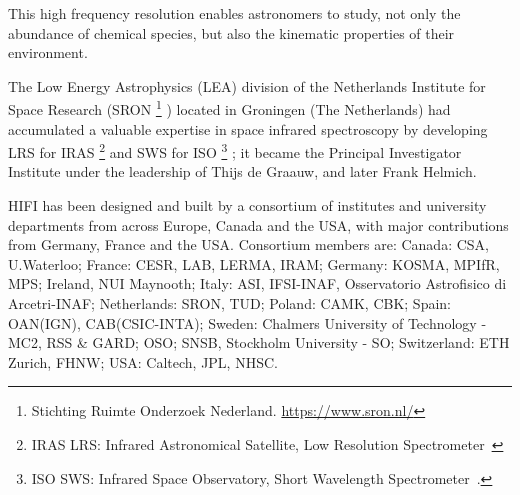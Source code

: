 This high frequency resolution enables astronomers to study, not only the abundance of chemical species, but also the kinematic properties of their environment.

The Low Energy Astrophysics (LEA) division of the Netherlands Institute for Space Research (SRON%
\footnote{
    Stichting Ruimte Onderzoek Nederland.
    \url{https://www.sron.nl/}
}%
) located in Groningen (The Netherlands)
had accumulated a valuable expertise in space infrared spectroscopy by developing
LRS for IRAS%
\footnote{
    IRAS LRS: Infrared Astronomical Satellite, Low Resolution Spectrometer~\parencite{neugebauer1984infrared}
}
and SWS for ISO%
\footnote{
   ISO SWS: Infrared Space Observatory, Short Wavelength Spectrometer~\parencite{isoHandbook5}.
}%
;
it became the Principal Investigator Institute under the leadership of Thijs de Graauw, and later Frank Helmich.

HIFI has been designed and built by a consortium of institutes and university departments from across Europe, Canada and the USA, with major contributions from Germany, France and the USA. Consortium members are: Canada: CSA, U.Waterloo; France: CESR, LAB, LERMA, IRAM; Germany: KOSMA, MPIfR, MPS; Ireland, NUI Maynooth; Italy: ASI, IFSI-INAF, Osservatorio Astrofisico di Arcetri-INAF; Netherlands: SRON, TUD; Poland: CAMK, CBK; Spain: OAN(IGN), CAB(CSIC-INTA); Sweden: Chalmers University of Technology - MC2, RSS \& GARD; OSO; SNSB, Stockholm University - SO; Switzerland: ETH Zurich, FHNW; USA: Caltech, JPL, NHSC.


